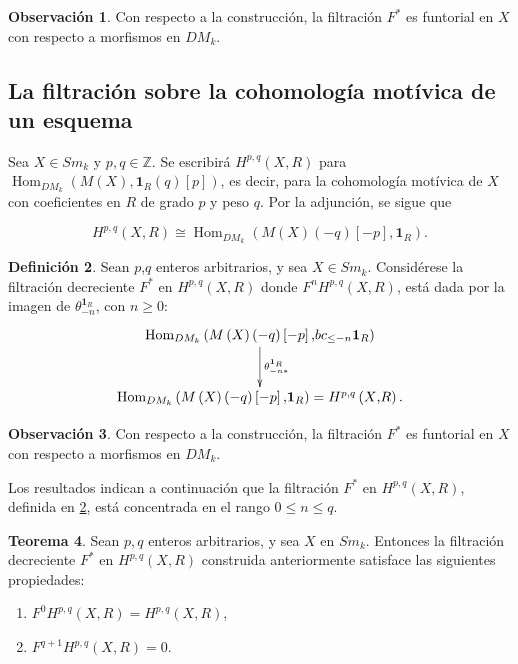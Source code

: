 \documentclass[10pt]{amsart}
\theoremstyle{definition}
\newtheorem{definition}{Definici\'on}[section]
\newtheorem{obs}[definition]{Observaci\'on}
\newtheorem{theorem}[definition]{Teorema}
\theoremstyle{remark}
\theoremstyle{definition}
\begin{document}
\begin{obs} Con respecto a la construcción, la filtración $F^{*}$ es funtorial en $X$ con respecto a morfismos en $DM_{k}$.
\end{obs}

\subsection{La filtraci\'on sobre la cohomolog\'ia mot\'ivica de un esquema}
Sea $X \in Sm_{\mathit{k}}$ y $p,q \in \mathbb{Z}$. Se escribirá $H^{p,q}(X,R)$ para $\operatorname{Hom}_{DM_{k}}(M(X),\textbf{1}_{R}(q)[p])$, es decir, para la cohomolog\'ia mot\'ivica de $X$ con coeficientes en $R$ de grado $p$ y peso $q$. Por la adjunci\'on, se sigue que

\begin{equation*}
H^{p,q}(X,R) \cong\operatorname{Hom}_{DM_{k}}(M(X)(-q)[-p],\textbf{1}_{R}).
\end{equation*}

\begin{definition}\label{def_filt}
 Sean $p$,$q$ enteros arbitrarios, y sea $X \in Sm_{\mathit{k}}$. Considérese la filtración decreciente $F^{*}$ en $H^{p,q}(X,R)$ donde $F^{n}H^{p,q}(X,R)$, está dada por la imagen de $\theta^{\mathbf{1}_R}_{-n}$, con $n\geq 0$:
$$\xymatrix@R=10mm{ 
\text{Hom}_{DM_{k}}\left(M\left(X\right)\left( -q\right)  \left[-p\right]\text{,}bc_{\leq{-n}}\textbf{1}_{R}  \right) 
\ar@{->}[d]^{\theta_{-n\ast}^{\textbf{1}_{R}}}
\\
\text{Hom}_{DM_{k}}\left(M\left(X\right)\left( -q\right)  \left[-p\right]\text{,}\textbf{1}_{R}\right)=H^{p\text{,}q}\left( X \text{,}R\right). 
}$$

\end{definition}

\begin{obs} Con respecto a la construcción, la filtración $F^{*}$ es funtorial en $X$ con respecto a morfismos en $DM_{k}$.
\end{obs}

Los resultados indican a continuación que la filtración $F^{*}$ en $H^{p,q}(X,R)$, definida en \ref{def_filt}, está concentrada en el rango $0 \leq n \leq q$.

\begin{theorem}
Sean $p,q$ enteros arbitrarios, y sea $X$ en $Sm_{\mathit{k}}$. Entonces la filtraci\'on decreciente $F^{*}$ en $H^{p,q}(X,R)$ construida anteriormente satisface las siguientes propiedades:
\begin{enumerate}
\item$ F^{0}H^{p,q}(X,R)=H^{p,q}(X,R)$,
\item $F^{q+1}H^{p,q}(X,R)=0$.
\end{enumerate}
\end{theorem}
\end{document}
